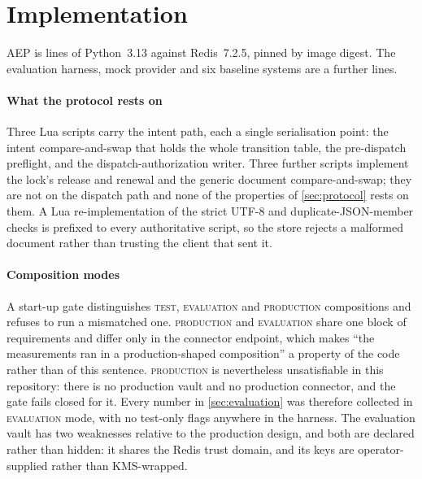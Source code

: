 \section{Implementation}
\label{sec:implementation}

AEP is \CoreLoc{} lines of Python~3.13 against Redis~7.2.5, pinned by image
digest. The evaluation harness, mock provider and six baseline systems are a
further \HarnessLoc{} lines.

\paragraph{What the protocol rests on} Three Lua scripts carry the intent
path, each a single serialisation point: the intent compare-and-swap that
holds the whole transition table, the pre-dispatch preflight, and the
dispatch-authorization writer. Three further scripts implement the lock's
release and renewal and the generic document compare-and-swap; they are not on
the dispatch path and none of the properties of \cref{sec:protocol} rests on
them. A Lua re-implementation of the strict UTF-8 and duplicate-JSON-member
checks is prefixed to every authoritative script, so the store rejects a
malformed document rather than trusting the client that sent it.

\paragraph{Composition modes} A start-up gate distinguishes \textsc{test},
\textsc{evaluation} and \textsc{production} compositions and refuses to run a
mismatched one. \textsc{production} and \textsc{evaluation} share one block of
requirements and differ only in the connector endpoint, which makes ``the
measurements ran in a production-shaped composition'' a property of the code
rather than of this sentence. \textsc{production} is nevertheless
unsatisfiable in this repository: there is no production vault and no
production connector, and the gate fails closed for it. Every number in
\cref{sec:evaluation} was therefore collected in \textsc{evaluation} mode, with
no test-only flags anywhere in the harness. The evaluation vault has two
weaknesses relative to the production design, and both are declared rather than
hidden: it shares the Redis trust domain, and its keys are operator-supplied
rather than KMS-wrapped.

